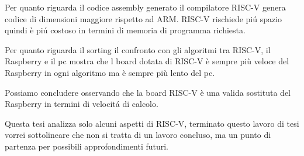 \documentclass[12pt, a4paper]{report}
\begin{document}


Per quanto riguarda il codice assembly generato il compilatore RISC-V genera codice di dimensioni maggiore rispetto ad ARM. RISC-V rischiede pi\'u spazio quindi è pi\'u costoso in termini di memoria di programma richiesta. 

Per quanto riguarda il sorting il confronto con gli algoritmi tra RISC-V, il Raspberry e il pc mostra che l board dotata di RISC-V è sempre più veloce del Raspberry in ogni algoritmo ma è sempre più lento del pc.

Possiamo concludere osservando che la board RISC-V è una valida sostituta del Raspberry in termini di velocit\'a di calcolo.%

Questa tesi analizza solo alcuni aspetti di RISC-V, terminato questo lavoro di tesi vorrei sottolineare che non si tratta di un lavoro concluso, ma un punto di partenza per possibili approfondimenti futuri. 






\printbibliography 
\end{document}
